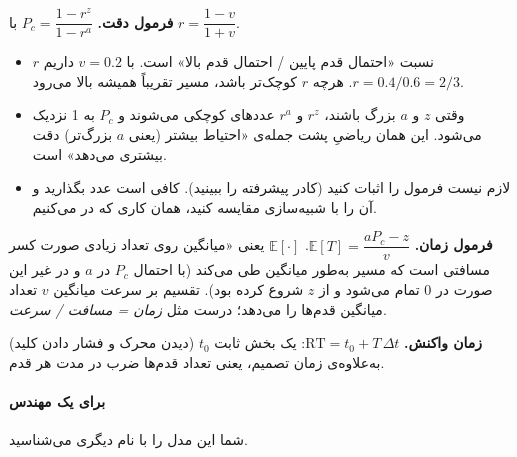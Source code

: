 \textbf{فرمول دقت.} \(P_c = \dfrac{1 - r^{z}}{1 - r^{a}}\) با
\(r = \dfrac{1-v}{1+v}\).

\begin{itemize}
\tightlist
\item
  \(r\) نسبت «احتمال قدم پایین / احتمال قدم بالا» است. با \(v = 0.2\)
  داریم \(r = 0.4/0.6 = 2/3\). هرچه \(r\) کوچک‌تر باشد، مسیر تقریباً همیشه
  بالا می‌رود.
\item
  وقتی \(z\) و \(a\) بزرگ باشند، \(r^{z}\) و \(r^{a}\) عددهای کوچکی
  می‌شوند و \(P_c\) به 1 نزدیک می‌شود. این همان ریاضیِ پشت جمله‌ی «احتیاط
  بیشتر (یعنی \(a\) بزرگ‌تر) دقت بیشتری می‌دهد» است.
\item
  لازم نیست فرمول را اثبات کنید (کادر پیشرفته را ببینید). کافی است عدد
  بگذارید و آن را با شبیه‌سازی مقایسه کنید، همان کاری که در 
  می‌کنیم.
\end{itemize}

\textbf{فرمول زمان.} \(\mathbb{E}[T] = \dfrac{a P_c - z}{v}\).
\(\mathbb{E}[\cdot]\) یعنی «میانگین روی تعداد زیادی  صورت
کسر مسافتی است که مسیر به‌طور میانگین طی می‌کند (با احتمال \(P_c\) در
\(a\) و در غیر این صورت در \(0\) تمام می‌شود و از \(z\) شروع کرده بود).
تقسیم بر سرعت میانگین \(v\) تعداد میانگین قدم‌ها را می‌دهد؛ درست مثل
\emph{زمان = مسافت / سرعت}.

\textbf{زمان واکنش.} \(\mathrm{RT} = t_0 + T\,\Delta t\): یک بخش ثابت
\(t_0\) (دیدن محرک و فشار دادن کلید) به‌علاوه‌ی زمان تصمیم، یعنی تعداد
قدم‌ها ضرب در مدت هر قدم.

\paragraph{برای یک مهندس}

شما این مدل را با نام دیگری می‌شناسید.

